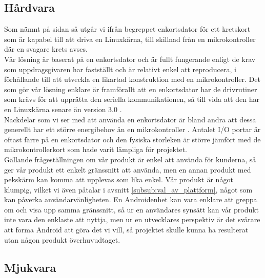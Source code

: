\documentclass{article}
\begin{document}
        \subsection{Hårdvara} %
        \label{sub:d_hardvara}
        
            Som nämnt på sidan \pageref{sub:beteckningar} så utgår vi ifrån begreppet enkortsdator för ett kretskort som är kapabel till att driva en Linuxkärna, till skillnad från en mikrokontroller där en svagare krets avses.\\

            \noindent Vår lösning är baserat på en enkortsdator och är fullt fungerande enligt de krav som uppdragsgivaren har fastställt och är relativt enkel att reproducera, i förhållande till att utveckla en likartad konstruktion med en mikrokontroller. Det som gör vår lösning enklare är framförallt att en enkortsdator har de drivrutiner som krävs för att upprätta den seriella kommunikationen, så till vida att den har en Linuxkärna senare än version 3.0 \cite{silicon}. \\

            \noindent Nackdelar som vi ser med att använda en enkortsdator är bland andra att dessa generellt har ett större energibehov än en mikrokontroller \cite{gadgetBlog, rasp}. Antalet I/O portar är oftast färre på en enkortsdator och den fysiska storleken är större jämfört med de mikrokontrollerkort som hade varit lämpliga för projektet.\\

            \noindent Gällande frågeställningen om vår produkt är enkel att använda för kunderna, så ger vår produkt ett enkelt gränssnitt att använda, men en annan produkt med pekskärm kan komma att upplevas som lika enkel. Vår produkt är något klumpig, vilket vi även påtalar i avsnitt \ref{subsub:val_av_plattform}, något som kan påverka användarvänligheten. En Androidenhet kan vara enklare att greppa om och visa upp samma gränssnitt, så ur en användares synsätt kan vår produkt inte vara den enklaste att nyttja, men ur en utvecklares perspektiv är det svårare att forma Android att göra det vi vill, så projektet skulle kunna ha resulterat utan någon produkt överhuvudtaget.

        \newpage
        \subsection{Mjukvara} %
        \label{sub:d_mjukvara}
\end{document}
